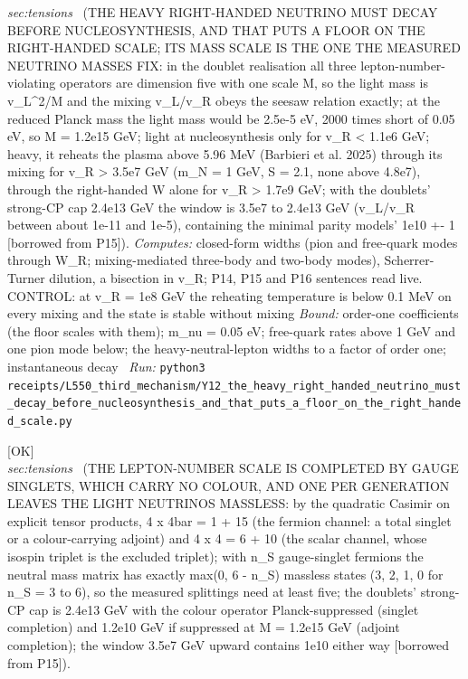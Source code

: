 \begin{description}
\textit{sec:tensions} \ (THE HEAVY RIGHT-HANDED NEUTRINO MUST DECAY BEFORE NUCLEOSYNTHESIS, AND THAT PUTS A FLOOR ON THE RIGHT-HANDED SCALE; ITS MASS SCALE IS THE ONE THE MEASURED NEUTRINO MASSES FIX: in the doublet realisation all three lepton-number-violating operators are dimension five with one scale M, so the light mass is v\_L\textasciicircum{}2/M and the mixing v\_L/v\_R obeys the seesaw relation exactly; at the reduced Planck mass the light mass would be 2.5e-5 eV, 2000 times short of 0.05 eV, so M = 1.2e15 GeV; light at nucleosynthesis only for v\_R < 1.1e6 GeV; heavy, it reheats the plasma above 5.96 MeV (Barbieri et al. 2025) through its mixing for v\_R > 3.5e7 GeV (m\_N = 1 GeV, S = 2.1, none above 4.8e7), through the right-handed W alone for v\_R > 1.7e9 GeV; with the doublets' strong-CP cap 2.4e13 GeV the window is 3.5e7 to 2.4e13 GeV (v\_L/v\_R between about 1e-11 and 1e-5), containing the minimal parity models' 1e10 +- 1 [borrowed from P15]). 
\emph{Computes:} closed-form widths (pion and free-quark modes through W\_R; mixing-mediated three-body and two-body modes), Scherrer-Turner dilution, a bisection in v\_R; P14, P15 and P16 sentences read live. CONTROL: at v\_R = 1e8 GeV the reheating temperature is below 0.1 MeV on every mixing and the state is stable without mixing
 \emph{Bound:} order-one coefficients (the floor scales with them); m\_nu = 0.05 eV; free-quark rates above 1 GeV and one pion mode below; the heavy-neutral-lepton widths to a factor of order one; instantaneous decay
\ \emph{Run:} \texttt{python3 receipts/L550\_third\_mechanism/Y12\_the\_heavy\_right\_handed\_neutrino\_must\_decay\_before\_nucleosynthesis\_and\_that\_puts\_a\_floor\_on\_the\_right\_handed\_scale.py}
\item[\label{rcpt:Y13_the_lepton_number_scale_is_completed_by_gauge_singlets_which_carry_no_colour_and_one_per_generation_leaves_the_light_neutrinos_massless}\textbf{}\quad\texttt{Y13\_the\_lepton\_number\_scale\_is\_completed\_by\_gauge\_singlets\_which\_carry\_no\_colour\_and\_one\_per\_generation\_leaves\_the\_light\_neutrinos\_massless}]\hfill\textsf{[OK]}\\
\textit{sec:tensions} \ (THE LEPTON-NUMBER SCALE IS COMPLETED BY GAUGE SINGLETS, WHICH CARRY NO COLOUR, AND ONE PER GENERATION LEAVES THE LIGHT NEUTRINOS MASSLESS: by the quadratic Casimir on explicit tensor products, 4 x 4bar = 1 + 15 (the fermion channel: a total singlet or a colour-carrying adjoint) and 4 x 4 = 6 + 10 (the scalar channel, whose isospin triplet is the excluded triplet); with n\_S gauge-singlet fermions the neutral mass matrix has exactly max(0, 6 - n\_S) massless states (3, 2, 1, 0 for n\_S = 3 to 6), so the measured splittings need at least five; the doublets' strong-CP cap is 2.4e13 GeV with the colour operator Planck-suppressed (singlet completion) and 1.2e10 GeV if suppressed at M = 1.2e15 GeV (adjoint completion); the window 3.5e7 GeV upward contains 1e10 either way [borrowed from P15]). 

\end{description}
